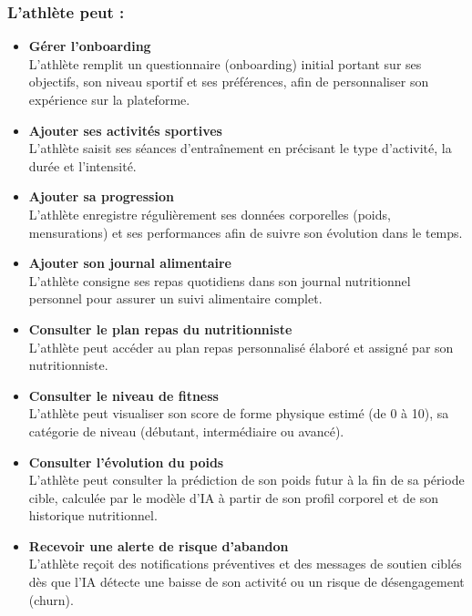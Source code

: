 \documentclass[a4paper,12pt]{report}
\begin{document}
\subsubsection*{L'athlète peut :}
\begin{itemize}
    
    \item \textbf{Gérer l'onboarding} \\
    L'athlète remplit un questionnaire (onboarding) initial portant sur 
    ses objectifs, son niveau sportif et ses préférences, afin de personnaliser son expérience 
    sur la plateforme.
    
    \item \textbf{Ajouter ses activités sportives} \\
    L'athlète saisit ses séances d'entraînement 
    en précisant le type d'activité, la durée et l'intensité. 
   
    \item \textbf{Ajouter sa progression} \\
    L'athlète enregistre régulièrement ses données 
    corporelles (poids, mensurations) et ses performances afin de suivre son évolution dans 
    le temps.
    \item \textbf{Ajouter son journal alimentaire} \\
    L'athlète consigne ses repas quotidiens 
    dans son journal nutritionnel personnel pour assurer un suivi alimentaire complet.
    \item \textbf{Consulter le plan repas du nutritionniste} \\
    L'athlète peut accéder au plan 
    repas personnalisé élaboré et assigné par son nutritionniste.
 \item \textbf{Consulter le niveau de fitness} \\
    L’athlète peut visualiser son score de forme physique estimé (de 0 à 10), sa catégorie de niveau (débutant, intermédiaire ou avancé).

    \item \textbf{Consulter l’évolution du poids} \\
    L’athlète peut consulter la prédiction de son poids futur à la fin de sa période cible, calculée par le modèle d'IA à partir de son profil corporel et de son historique nutritionnel.

    \item \textbf{Recevoir une alerte de risque d’abandon} \\
    L’athlète reçoit des notifications préventives et des messages de soutien ciblés dès que l'IA détecte une baisse de son activité ou un risque de désengagement (churn).



\end{itemize}
\end{document}
